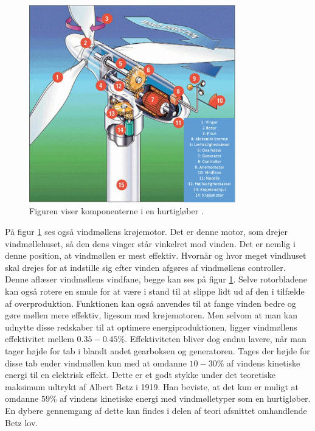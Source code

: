 \begin{figure}[H]
\centering
\includegraphics[width=0.80\textwidth]{Billeder/vindmollen}
\caption{Figuren viser komponenterne i en hurtigløber \citep{windturbine}.}
\label{fig:vindmollen}
\end{figure}

På figur \ref{fig:vindmollen} ses også vindmøllens krøjemotor. Det er denne motor, som drejer vindmøllehuset, så den dens vinger står vinkelret mod vinden. Det er nemlig i denne position, at vindmøllen er mest effektiv. Hvornår og hvor meget vindhuset skal drejes for at indstille sig efter vinden afgøres af vindmøllens controller. Denne aflæser vindmøllens vindfane, begge kan ses på figur \ref{fig:vindmollen}. Selve rotorbladene kan også rotere en smule for at være i stand til  at slippe lidt ud af den i tilfælde af overproduktion. Funktionen kan også anvendes til at fange vinden bedre og gøre møllen mere effektiv, ligesom med krøjemotoren. 
Men selvom at man kan udnytte disse redskaber til at optimere energiproduktionen, ligger vindmøllens effektivitet mellem $0.35-0.45 \%$.
Effektiviteten bliver dog endnu lavere, når man tager højde for tab i blandt andet gearboksen og generatoren. Tages der højde for disse tab ender vindmøllen kun med at omdanne $10-30 \%$ af vindens kinetiske energi til en elektrisk effekt.
Dette er et godt stykke under det teoretiske maksimum udtrykt af Albert Betz i 1919. Han beviste, at det kun er muligt at omdanne $59 \%$ af vindens kinetiske energi med vindmølletyper som en hurtigløber. En dybere gennemgang af dette kan findes i delen af teori afsnittet omhandlende Betz lov. 


